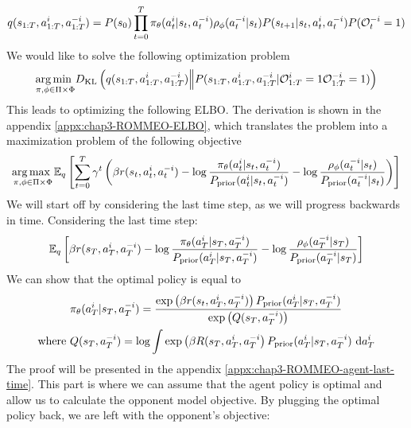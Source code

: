 \begin{equation}
    q(s_{1:T}, a_{1:T}^i, a^{-i}_{1:T}) = P(s_0) \prod^T_{t=0} \pi_{\theta}(a^i_t | s_t, a^{-i}_t) \rho_{\phi}(a^{-i}_t | s_t) P(s_{t+1} | s_t, a^i_t, a^{-i}_t)P(\mathcal{O}^{-i}_t = 1)
\end{equation}
We would like to solve the following optimization problem 
\begin{equation}
    \underset{\pi, \phi \in \Pi \times \Phi}{\arg\min \ }  D_{\mathrm{KL}}\left( q(s_{1:T}, a_{1:T}^i, a^{-i}_{1:T}) \Big\| P(s_{1:T}, a^i_{1:T}, a^{-i}_{1:T}|\mathcal{O}^i_{1:T} = 1  \mathcal{O}^{-i}_{1:T} = 1)  \right)
\end{equation}
This leads to optimizing the following ELBO. The derivation is shown in the appendix \ref{appx:chap3-ROMMEO-ELBO}, which translates the problem into a maximization problem of the following objective
\begin{equation}
\label{eqn:chap3-ROMMEO-ELBO}
    \underset{\pi, \phi \in \Pi \times \Phi}{\arg\max \ } \mathbb{E}_{q}\left[  \sum^T_{t=0} \gamma^t\left( \beta r(s_t, a^i_t, a^{-i}_t)  - \log \frac{\pi_{\theta}(a^i_t | s_t, a^{-i}_t)}{P_{\text{prior}}(a^i_t | s_t, a^{-i}_t) } - \log \frac{\rho_{\phi}(a^{-i}_t | s_t)}{P_{\text{prior}}(a^{-i}_t | s_t)} \right) \right]
\end{equation}
We will start off by considering the last time step, as we will progress backwards in time. Considering the last time step:
\begin{equation}
\label{eqn:training-obj-last-time}
    \mathbb{E}_{q} \left[  \beta r(s_T, a^i_T, a^{-i}_T)  - \log \frac{\pi_{\theta}(a^i_T | s_T, a^{-i}_T)}{P_{\text{prior}}(a^i_T | s_T, a^{-i}_T) } - \log \frac{\rho_{\phi}(a^{-i}_T | s_T)}{P_{\text{prior}}(a^{-i}_T | s_T)} \right]
\end{equation}
We can show that the optimal policy is equal to 
\begin{equation}
\begin{aligned}
    &\pi_{\theta}(a^i_T | s_T, a^{-i}_T) = \frac{\exp \left( \beta r(s_t, a^i_T, a^{-i}_T) \right)P_{\text{prior}}(a^i_T | s_T, a^{-i}_T)}{\exp\left( Q(s_T, a^{-i}_T) \right)} \\
    \text{where }& Q(s_T, a^{-i}_T) = \log \int \exp \left( \beta R(s_T, a^i_T, a^{-i}_T \right)P_{\text{prior}}(a^i_T | s_T, a^{-i}_T)  \ \mathrm{d} a^i_T
\end{aligned}
\end{equation}
The proof will be presented in the appendix \ref{appx:chap3-ROMMEO-agent-last-time}. This part is where we can assume that the agent policy is optimal and allow us to calculate the opponent model objective. By plugging the optimal policy back, we are left with the opponent's objective:
